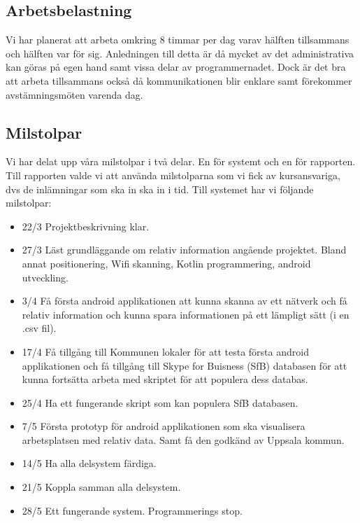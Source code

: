 \documentclass[a4paper,12pt]{article}
\begin{document}
\subsection{Arbetsbelastning}
Vi har planerat att arbeta omkring 8 timmar per dag varav hälften tillsammans och hälften var för sig. Anledningen till detta är då mycket av det administrativa kan göras på egen hand samt vissa delar av programmernadet. Dock är det bra att arbeta tillsammans också då kommunikationen blir enklare samt förekommer avstämningsmöten varenda dag.

\subsection{Milstolpar}
Vi har delat upp våra milstolpar i två delar. En för systemt och en för rapporten. Till rapporten valde vi att använda milstolparna som vi fick av kursansvariga, dvs de inlämningar som ska in ska in i tid. Till systemet har vi följande milstolpar:
\begin{itemize}
	\item 22/3 Projektbeskrivning klar.
	\item 27/3 Läst grundläggande om relativ information angående projektet. Bland annat positionering, Wifi skanning, Kotlin programmering, android utveckling.
	\item 3/4 Få första android applikationen att kunna skanna av ett nätverk och få relativ information och kunna spara informationen på ett lämpligt sätt (i en .csv fil).
	\item 17/4 Få tillgång till Kommunen lokaler för att testa första android applikationen och få tillgång till Skype for Buisness (SfB) databasen för att kunna fortsätta arbeta med skriptet för att populera dess databas.
 	\item 25/4 Ha ett fungerande skript som kan populera  SfB databasen.
	\item 7/5 Första prototyp för android applikationen som ska visualisera arbetsplatsen med relativ data. Samt få den godkänd av Uppsala kommun.
	\item 14/5 Ha alla delsystem färdiga.
	\item 21/5 Koppla samman alla delsystem.
	\item 28/5 Ett fungerande system. Programmerings stop.
\end{itemize}
\end{document}
